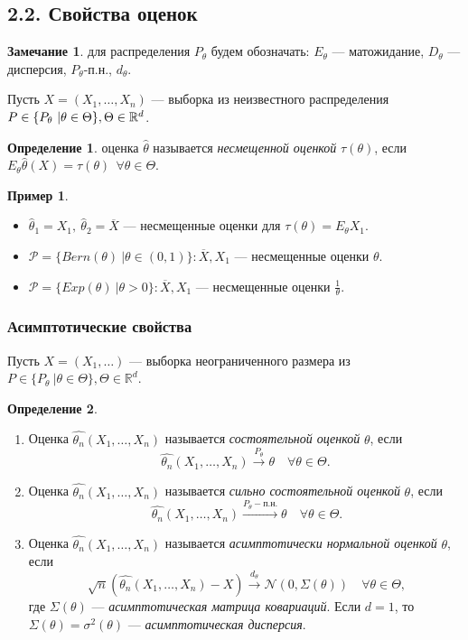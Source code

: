 \documentclass[12pt]{report}
\theoremstyle{definition}
\newtheorem{definition}{Определение}
\newtheorem{example}{Пример}
\newtheorem{remark}{Замечание}
\begin{document}
\subsection{2.2. Свойства оценок}
\begin{remark}
	для распределения $P_\theta$ будем обозначать: $E_\theta$ — матожидание, $D_\theta$ — дисперсия, $P_\theta$-п.н., $d_\theta$.
\end{remark}

Пусть $X = (X_1, \dots, X_n)$ — выборка из неизвестного распределения $\\P \in \{P_\theta \ \vert \theta \in \Theta \}, \Theta \in \mathbb{R}^d$.

\begin{definition}
	оценка $\hat{\theta}$ называется \emph{несмещенной оценкой} $\tau(\theta)$, если  $E_\theta \hat{\theta}(X) = \tau(\theta)\ \ \forall \theta \in \Theta$. 
\end{definition}
\begin{example}
	$\;$
	\begin{itemize}
		\item $\hat{\theta}_1 = X_1,\ \hat{\theta}_2 = \overline{X}$ — несмещенные оценки для $\tau(\theta) = E_\theta X_1.$
		\item $\mathcal{P} = \{Bern(\theta) \ \vert \theta \in (0, 1) \}: \overline{X}, X_1$ — несмещенные оценки $\theta$.
		\item $\mathcal{P} = \{Exp(\theta) \ \vert \theta > 0 \}: \overline{X}, X_1$ — несмещенные оценки $\frac{1}{\theta}$.
	\end{itemize}
\end{example}

\subsubsection{Асимптотические свойства}

Пусть $X = (X_1, \dots)$ — выборка неограниченного размера из $P \in \{P_\theta \ \vert \theta \in \Theta \}, \Theta \in \mathbb{R}^d$.

\begin{definition}
	$\;$
	\begin{enumerate}
		\item Оценка $\hat{\theta_n}(X_1, \dots, X_n)$ называется \emph{состоятельной оценкой} $\theta$, если $$\hat{\theta_n}(X_1, \dots, X_n) \xrightarrow{P_\theta} \theta \quad \forall \theta \in \Theta.$$
		\item Оценка $\hat{\theta_n}(X_1, \dots, X_n)$ называется \emph{сильно состоятельной оценкой} $\theta$, если $$\ \hat{\theta_n}(X_1, \dots, X_n) \xrightarrow{P_\theta-п.н.} \theta \quad \forall \theta \in \Theta.$$
		\item Оценка $\hat{\theta_n}(X_1, \dots, X_n)$ называется \emph{асимптотически нормальной оценкой} $\theta$, если $$\ \sqrt{n}(\hat{\theta_n}(X_1, \dots, X_n) - X) \xrightarrow{d_\theta} \mathcal{N}(0, \Sigma(\theta)) \quad \forall \theta \in \Theta,$$
		где $\Sigma(\theta)$ — \emph{асимптотическая матрица ковариаций}.
		Если $d=1$, то $\Sigma(\theta) = \sigma^2(\theta)$ — \emph{асимптотическая дисперсия}.
	\end{enumerate}
\end{definition}
\end{document}
